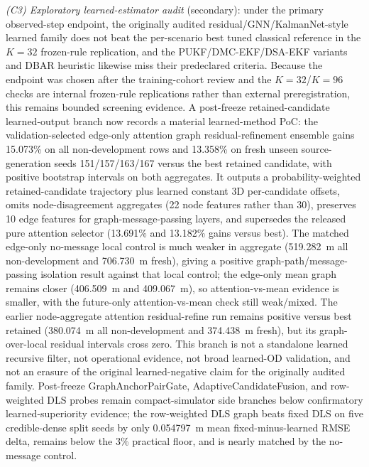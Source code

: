 \documentclass{article}
\begin{document}
\emph{(C3) Exploratory learned-estimator audit} (secondary): under the primary observed-step endpoint, the originally audited residual/GNN/KalmanNet-style learned family does not beat the per-scenario best tuned classical reference in the $K=32$ frozen-rule replication, and the PUKF/DMC-EKF/DSA-EKF variants and DBAR heuristic likewise miss their predeclared criteria. Because the endpoint was chosen after the training-cohort review and the $K=32$/$K=96$ checks are internal frozen-rule replications rather than external preregistration, this remains bounded screening evidence. A post-freeze retained-candidate learned-output branch now records a material learned-method PoC: the validation-selected edge-only attention graph residual-refinement ensemble gains 15.073\% on all non-development rows and 13.358\% on fresh unseen source-generation seeds 151/157/163/167 versus the best retained candidate, with positive bootstrap intervals on both aggregates. It outputs a probability-weighted retained-candidate trajectory plus learned constant 3D per-candidate offsets, omits node-disagreement aggregates (22 node features rather than 30), preserves 10 edge features for graph-message-passing layers, and supersedes the released pure attention selector (13.691\% and 13.182\% gains versus best). The matched edge-only no-message local control is much weaker in aggregate (519.282~m all non-development and 706.730~m fresh), giving a positive graph-path/message-passing isolation result against that local control; the edge-only mean graph remains closer (406.509~m and 409.067~m), so attention-vs-mean evidence is smaller, with the future-only attention-vs-mean check still weak/mixed. The earlier node-aggregate attention residual-refine run remains positive versus best retained (380.074~m all non-development and 374.438~m fresh), but its graph-over-local residual intervals cross zero. This branch is not a standalone learned recursive filter, not operational evidence, not broad learned-OD validation, and not an erasure of the original learned-negative claim for the originally audited family. Post-freeze GraphAnchorPairGate, AdaptiveCandidateFusion, and row-weighted DLS probes remain compact-simulator side branches below confirmatory learned-superiority evidence; the row-weighted DLS graph beats fixed DLS on five credible-dense split seeds by only 0.054797~m mean fixed-minus-learned RMSE delta, remains below the 3\% practical floor, and is nearly matched by the no-message control.
\end{document}
